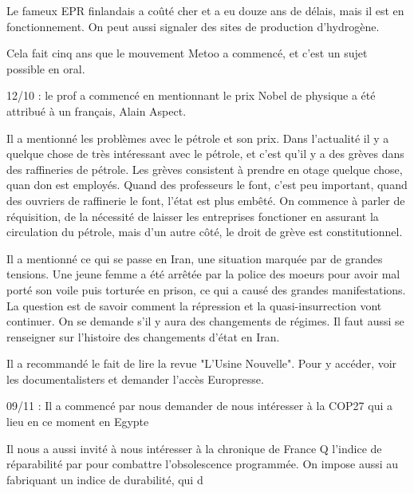 \documentclass[a4paper,12pt]{book}
\begin{document}
\par Le fameux EPR finlandais a coûté cher et a eu douze ans de délais, mais il est en fonctionnement. On peut aussi signaler des sites de production d'hydrogène.
\par Cela fait cinq ans que le mouvement Metoo a commencé, et c'est un sujet possible en oral.
\par 12/10 : le prof a commencé en mentionnant le prix Nobel de physique a été attribué à un français, Alain Aspect.
\par Il a mentionné les problèmes avec le pétrole et son prix. Dans l'actualité il y a quelque chose de très intéressant avec le pétrole, et c'est qu'il y a des grèves dans des raffineries de pétrole. Les grèves consistent à prendre en otage quelque chose, quan don est employés. Quand des professeurs le font, c'est peu important, quand des ouvriers de raffinerie le font, l'état est plus embêté. On commence à parler de réquisition, de la nécessité de laisser les entreprises fonctioner en assurant la circulation du pétrole, mais d'un autre côté, le droit de grève est constitutionnel.
\par Il a mentionné ce qui se passe en Iran, une situation marquée par de grandes tensions. Une jeune femme a été arrêtée par la police des moeurs pour avoir mal porté son voile puis torturée en prison, ce qui a causé des grandes manifestations. La question est de savoir comment la répression et la quasi-insurrection vont continuer. On se demande s'il y aura des changements de régimes. Il faut aussi se renseigner sur l'histoire des changements d'état en Iran.
\par Il a recommandé le fait de lire la revue "L'Usine Nouvelle". Pour y accéder, voir les documentalisters et demander l'accès Europresse.
\par 09/11 : Il a commencé par nous demander de nous intéresser à la COP27 qui a lieu en ce moment en Egypte
\par Il nous a aussi invité à nous intéresser à la chronique de France Q l'indice de réparabilité par pour combattre l'obsolescence programmée. On impose aussi au fabriquant un indice de durabilité, qui d
\end{document}
